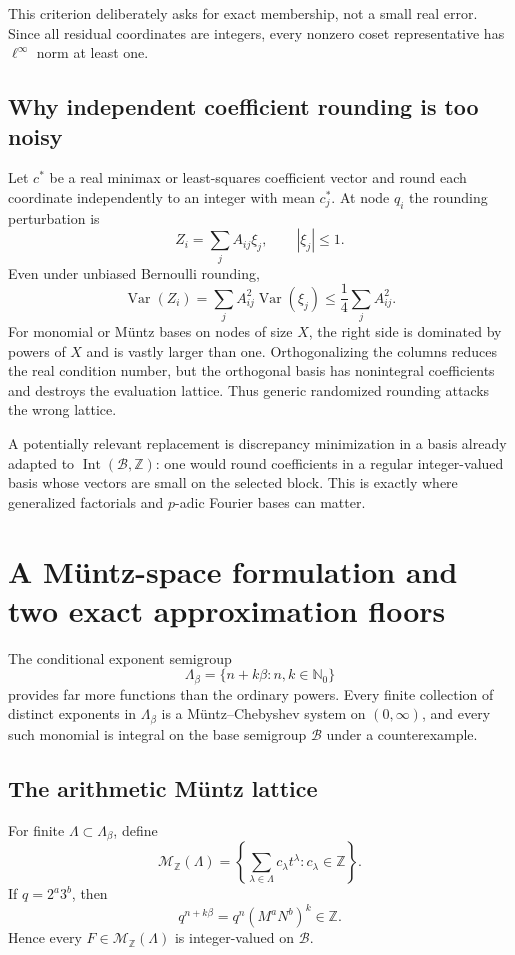 \documentclass[11pt,oneside]{article}
\theoremstyle{definition}
\theoremstyle{remark}
\newcommand{\Nzero}{\mathbb N_0}
\newcommand{\Z}{\mathbb Z}
\newcommand{\Bsem}{\mathcal B}
\newcommand{\Int}{\operatorname{Int}}
\begin{document}
This criterion deliberately asks for exact membership, not a small real error.  Since all
residual coordinates are integers, every nonzero coset representative has
$\ell^\infty$ norm at least one.

\subsection{Why independent coefficient rounding is too noisy}

Let $c^*$ be a real minimax or least-squares coefficient vector and round each coordinate
independently to an integer with mean $c_j^*$.  At node $q_i$ the rounding perturbation is
\[
 Z_i=\sum_j A_{ij}\xi_j,
 \qquad |\xi_j|\le1.
\]
Even under unbiased Bernoulli rounding,
\[
 \operatorname{Var}(Z_i)
 =\sum_j A_{ij}^2\operatorname{Var}(\xi_j)
 \le\frac14\sum_jA_{ij}^2.
\]
For monomial or M\"untz bases on nodes of size $X$, the right side is dominated by powers of
$X$ and is vastly larger than one.  Orthogonalizing the columns reduces the real condition
number, but the orthogonal basis has nonintegral coefficients and destroys the evaluation
lattice.  Thus generic randomized rounding attacks the wrong lattice.

A potentially relevant replacement is discrepancy minimization in a basis already adapted to
$\Int(\Bsem,\Z)$: one would round coefficients in a regular integer-valued basis whose
vectors are small on the selected block.  This is exactly where generalized factorials and
$p$-adic Fourier bases can matter.


\section{A M\"untz-space formulation and two exact approximation floors}
\label{sec:muntz}

The conditional exponent semigroup
\[
 \Lambda_\beta=\{n+k\beta:n,k\in\Nzero\}
\]
provides far more functions than the ordinary powers.  Every finite collection of distinct
exponents in $\Lambda_\beta$ is a M\"untz--Chebyshev system on $(0,\infty)$, and every such
monomial is integral on the base semigroup $\Bsem$ under a counterexample.

\subsection{The arithmetic M\"untz lattice}

For finite $\Lambda\subset\Lambda_\beta$, define
\[
 \mathcal M_\Z(\Lambda)
 =\left\{\sum_{\lambda\in\Lambda}c_\lambda t^\lambda:
               c_\lambda\in\Z\right\}.
\]
If $q=2^a3^b$, then
\[
 q^{n+k\beta}=q^n(M^aN^b)^k\in\Z.
\]
Hence every $F\in\mathcal M_\Z(\Lambda)$ is integer-valued on $\Bsem$.
\end{document}
